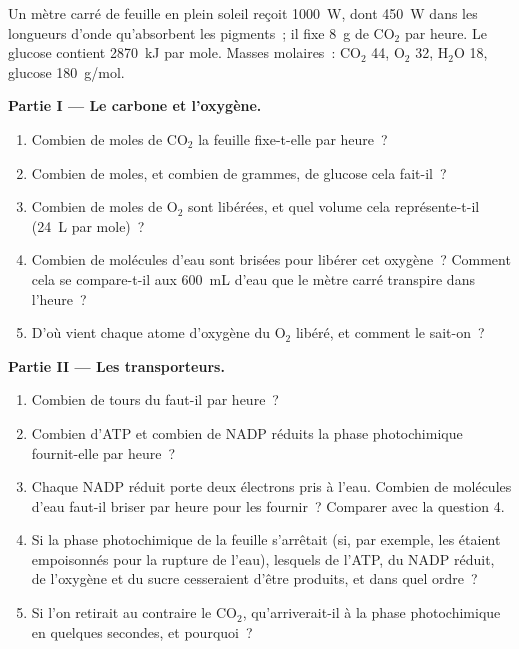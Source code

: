 \begin{problem}
\label{pb:g12:photosynthesis:1}
Un mètre carré de feuille en plein soleil reçoit \qty{1000}{W}, dont
\qty{450}{W} dans les longueurs d'onde qu'absorbent les pigments~; il
fixe \qty{8}{g} de $\mathrm{CO_2}$ par heure. Le glucose contient
\qty{2870}{kJ} par mole. Masses molaires~: $\mathrm{CO_2}$ 44,
$\mathrm{O_2}$ 32, $\mathrm{H_2O}$ 18, glucose \qty{180}{g/mol}.

\medskip
\noindent\textbf{Partie I --- Le carbone et l'oxygène.}
\begin{enumerate}
  \item Combien de moles de $\mathrm{CO_2}$ la feuille fixe-t-elle par
        heure~?
  \item Combien de moles, et combien de grammes, de glucose cela
        fait-il~?
  \item Combien de moles de $\mathrm{O_2}$ sont libérées, et quel
        volume cela représente-t-il (\qty{24}{L} par mole)~?
  \item Combien de molécules d'eau sont brisées pour libérer cet
        oxygène~? Comment cela se compare-t-il aux \qty{600}{mL} d'eau
        que le mètre carré transpire dans l'heure~?
  \item D'où vient chaque atome d'oxygène du $\mathrm{O_2}$ libéré, et
        comment le sait-on~?
\end{enumerate}

\medskip
\noindent\textbf{Partie II --- Les transporteurs.}
\begin{enumerate}[resume]
  \item Combien de tours du  faut-il par heure~?
  \item Combien d'ATP et combien de NADP réduits la phase
        photochimique fournit-elle par heure~?
  \item Chaque NADP réduit porte deux électrons pris à l'eau. Combien
        de molécules d'eau faut-il briser par heure pour les fournir~?
        Comparer avec la question 4.
  \item Si la phase photochimique de la feuille s'arrêtait (si, par
        exemple, les  étaient empoisonnés pour la rupture
        de l'eau), lesquels de l'ATP, du NADP réduit, de l'oxygène et
        du sucre cesseraient d'être produits, et dans quel ordre~?
  \item Si l'on retirait au contraire le $\mathrm{CO_2}$,
        qu'arriverait-il à la phase photochimique en quelques
        secondes, et pourquoi~?
\end{enumerate}


\end{problem}
